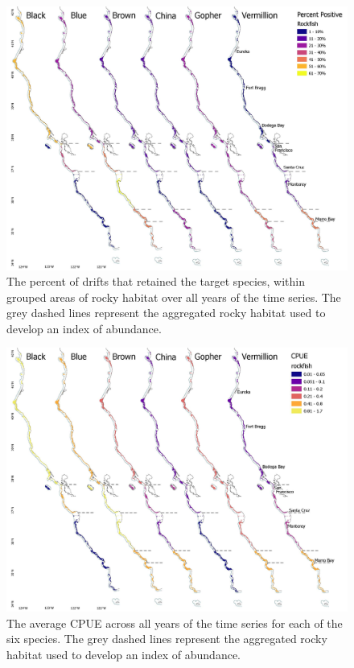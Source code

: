 \documentclass[
  12pt,
  authoryear,
  preprint,
  3p]{elsarticle}
\begin{document}
\begin{figure}

{\centering \includegraphics{figures/percentpositives_map.jpg}

}

\caption{\label{fig-percentpos}The percent of drifts that retained the
target species, within grouped areas of rocky habitat over all years of
the time series. The grey dashed lines represent the aggregated rocky
habitat used to develop an index of abundance.}

\end{figure}

\begin{figure}

{\centering \includegraphics{figures/CPUE_map.jpg}

}

\caption{\label{fig-cpue}The average CPUE across all years of the time
series for each of the six species. The grey dashed lines represent the
aggregated rocky habitat used to develop an index of abundance.}

\end{figure}
\end{document}
